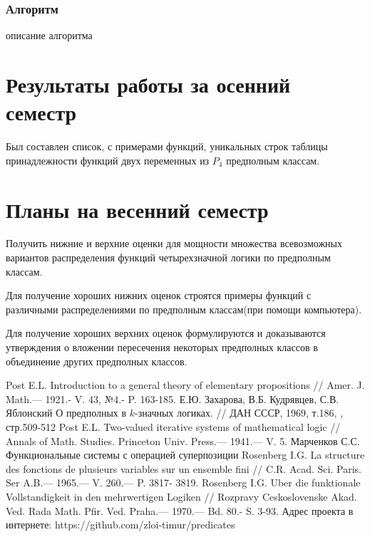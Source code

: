 \documentclass[a4paper,14pt]{extreport}
\begin{document}
\subsection{Алгоритм}
описание алгоритма


\newpage
\chapter{Результаты работы за осенний семестр}
Был составлен список, с примерами функций, уникальных строк таблицы принадлежности функций двух переменных из $P_4$ предполным классам. 

\chapter{Планы на весенний семестр}
Получить нижние и верхние оценки для мощности множества всевозможных вариантов распределения функций четырехзначной логики по предполным классам.

Для получение хороших нижних оценок строятся примеры функций с различными распределениями по предполным классам(при помощи компьютера).

Для получение хороших верхних оценок формулируются и доказываются утверждения о вложении пересечения некоторых предполных классов в объединение других предполных классов.
  

\newpage
{}
\begin{thebibliography}{9}
	Post E.L. Introduction to a general theory of elementary propositions // 
Amer. J. Math.— 1921.- V. 43, №4.- P. 163-185. 
 Е.Ю. Захарова, В.Б. Кудрявцев, С.В. Яблонский О предполных в $k$-значных логиках. // ДАН СССР, 1969, т.186, , стр.509-512 
	Post E.L. Two-valued iterative systems of mathematical logic // Annals of 
Math. Studies. Princeton Univ. Press.— 1941.— V. 5. 
 Марченков С.С. Функциональные системы с операцией суперпозиции
	Rosenberg I.G. La structure des fonctions de plusieurs variables sur un ensemble fini // C.R. Acad. Sci. Paris. Ser A.B.— 1965.— V. 260.— P. 3817- 3819. 
	Rosenberg I.G. Uber die funktionale Vollstandigkeit in den mehrwertigen Logiken // Rozpravy Ceskoslovenske Akad. Ved. Rada Math. Pfir. Ved. Praha.— 1970.— Bd. 80.- S. 3-93. 
 Адрес проекта в интернете: https://github.com/zloi-timur/predicates 


\end{thebibliography}
\end{document}
